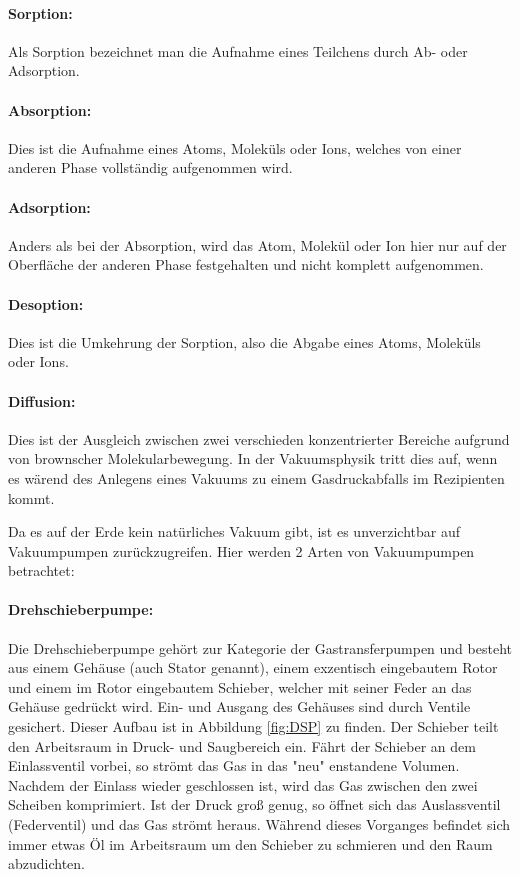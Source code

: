 \paragraph{Sorption:}
Als Sorption bezeichnet man die Aufnahme eines Teilchens durch Ab- oder Adsorption.

\paragraph{Absorption:}
Dies ist die Aufnahme eines Atoms, Moleküls oder Ions, welches von einer anderen Phase vollständig
aufgenommen wird.

\paragraph{Adsorption:}
Anders als bei der Absorption, wird das Atom, Molekül oder Ion hier nur auf der Oberfläche der anderen Phase
festgehalten und nicht komplett aufgenommen.

\paragraph{Desoption:}
Dies ist die Umkehrung der Sorption, also die Abgabe eines Atoms, Moleküls oder Ions.

 \paragraph{Diffusion:}
 Dies ist der Ausgleich zwischen zwei verschieden konzentrierter Bereiche
 aufgrund von brownscher Molekularbewegung. In der Vakuumsphysik tritt dies auf, wenn es wärend des Anlegens eines
 Vakuums zu einem Gasdruckabfalls im Rezipienten kommt.

 Da es auf der Erde kein natürliches Vakuum gibt, ist es unverzichtbar auf Vakuumpumpen zurückzugreifen. Hier werden
 2 Arten von Vakuumpumpen betrachtet:

 \paragraph{Drehschieberpumpe:}
 Die Drehschieberpumpe gehört zur Kategorie der Gastransferpumpen und besteht aus einem Gehäuse (auch Stator genannt), einem
 exzentisch eingebautem Rotor und einem im Rotor eingebautem Schieber, welcher mit seiner Feder an das Gehäuse gedrückt wird.
 Ein- und Ausgang des Gehäuses sind durch Ventile gesichert. Dieser Aufbau ist in Abbildung \ref{fig:DSP} zu finden.
 Der Schieber teilt den Arbeitsraum in Druck- und Saugbereich ein. Fährt der Schieber an dem Einlassventil vorbei, so strömt
 das Gas in das "neu" enstandene Volumen. Nachdem der Einlass wieder geschlossen ist, wird das Gas zwischen den zwei Scheiben komprimiert.
 Ist der Druck groß genug, so öffnet sich das Auslassventil (Federventil) und das Gas strömt heraus. Während dieses Vorganges
 befindet sich immer etwas Öl im Arbeitsraum um den Schieber zu schmieren und den Raum abzudichten.

